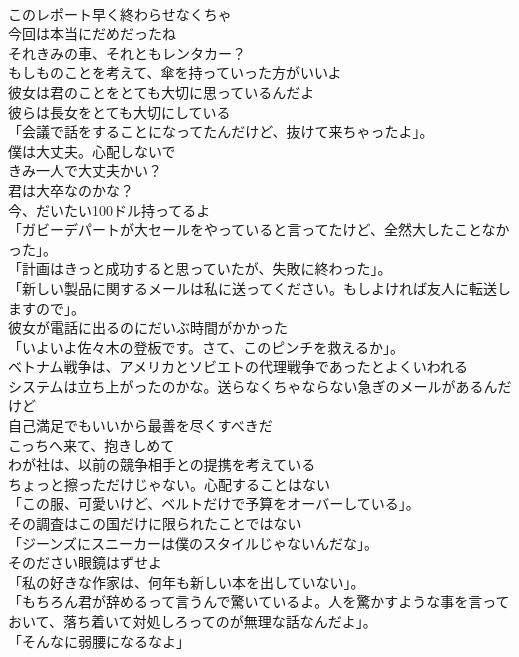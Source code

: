 \documentclass[8pt]{extreport}
\begin{document}
\begin{CJK}{UTF8}{min}
\\	このレポート早く終わらせなくちゃ	
\\	今回は本当にだめだったね	
\\	それきみの車、それともレンタカー？	
\\	もしものことを考えて、傘を持っていった方がいいよ	
\\	彼女は君のことをとても大切に思っているんだよ	
\\	彼らは長女をとても大切にしている	
\\	「会議で話をすることになってたんだけど、抜けて来ちゃったよ」。	
\\	僕は大丈夫。心配しないで	
\\	きみ一人で大丈夫かい？	
\\	君は大卒なのかな？	
\\	今、だいたい100ドル持ってるよ	
\\	「ガビーデパートが大セールをやっていると言ってたけど、全然大したことなかった」。	
\\	「計画はきっと成功すると思っていたが、失敗に終わった」。	
\\	「新しい製品に関するメールは私に送ってください。もしよければ友人に転送しますので」。	
\\	彼女が電話に出るのにだいぶ時間がかかった	
\\	「いよいよ佐々木の登板です。さて、このピンチを救えるか」。	
\\	ベトナム戦争は、アメリカとソビエトの代理戦争であったとよくいわれる	
\\	システムは立ち上がったのかな。送らなくちゃならない急ぎのメールがあるんだけど	
\\	自己満足でもいいから最善を尽くすべきだ	
\\	こっちへ来て、抱きしめて	
\\	わが社は、以前の競争相手との提携を考えている	
\\	ちょっと擦っただけじゃない。心配することはない	
\\	「この服、可愛いけど、ベルトだけで予算をオーバーしている」。	
\\	その調査はこの国だけに限られたことではない	
\\	「ジーンズにスニーカーは僕のスタイルじゃないんだな」。	
\\	そのださい眼鏡はずせよ	
\\	「私の好きな作家は、何年も新しい本を出していない」。	
\\	「もちろん君が辞めるって言うんで驚いているよ。人を驚かすような事を言っておいて、落ち着いて対処しろってのが無理な話なんだよ」。	
\\	「そんなに弱腰になるなよ」	

\end{CJK}
\end{document}
